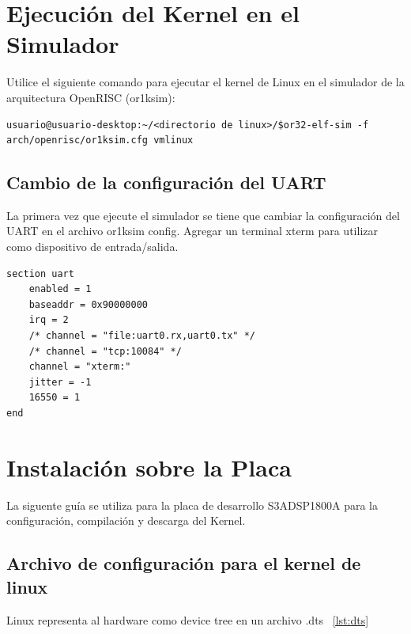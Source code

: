 \section{Ejecución del Kernel en el Simulador}

Utilice el siguiente comando para ejecutar el kernel de Linux en el simulador de la arquitectura OpenRISC (or1ksim): 

\begin{lstlisting}[breaklines]
usuario@usuario-desktop:~/<directorio de linux>/$or32-elf-sim -f arch/openrisc/or1ksim.cfg vmlinux
\end{lstlisting}
 
\subsection{Cambio de la configuración del UART}

La primera vez que ejecute el simulador se tiene que cambiar la configuración del UART en el archivo or1ksim  config. Agregar un terminal xterm para utilizar como dispositivo de entrada/salida.

\begin{lstlisting}[breaklines]
section uart
	enabled = 1
	baseaddr = 0x90000000
	irq = 2
	/* channel = "file:uart0.rx,uart0.tx" */
	/* channel = "tcp:10084" */
	channel = "xterm:"
	jitter = -1
	16550 = 1
end

\end{lstlisting}

\newpage
\section{Instalación sobre la Placa}
La siguente guía se utiliza para la placa de desarrollo S3ADSP1800A para la configuración, compilación y descarga del Kernel.

	\subsection{Archivo de configuración para el kernel de linux}
Linux representa al hardware como device tree en un archivo .dts ~\ref{lst:dts}

